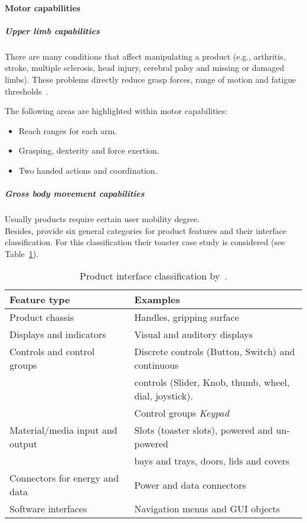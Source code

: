 \paragraph*{Motor capabilities}
\subparagraph*{Upper limb capabilities}
There are many conditions that affect manipulating a product (e.g., arthritis, 
stroke, multiple sclerosis, head injury, cerebral palsy and missing or damaged 
limbs). These problems directly reduce grasp forces, range of motion and fatigue 
thresholds~\cite{persad_characterising_2007}.

The following areas are highlighted within motor capabilities:
\begin{itemize}
  \item Reach ranges for each arm.
  \item Grasping, dexterity and force exertion.
  \item Two handed actions and coordination.
\end{itemize}

\subparagraph*{Gross body movement capabilities}
Usually products require certain user mobility degree. 
\\
Besides, \citeauthor{persad_characterising_2007} provide six general categories 
for product features and their interface classification. For this classification 
their toaster case study is considered (see Table~\ref{tbl:persad_product_interface}).

\begin{table}
  \caption{Product interface classification by~\citet{persad_characterising_2007}.}
  \label{tbl:persad_product_interface}
\footnotesize
\centering
    \begin{tabular}{l l}
    \hline
    \textbf{Feature type} & \textbf{Examples} \\
    \hline
    Product chassis & Handles, gripping surface \\
    Displays and indicators & Visual and auditory displays \\
    Controls and control groups & Discrete controls (Button, Switch) and continuous\\
    & controls (Slider, Knob, thumb, wheel, dial, joystick). \\
    & Control groups \textit{Keypad} \\
    Material/media input and output & Slots (toaster slots), powered and un-powered\\
    & bays and trays, doors, lids and covers\\
    Connectors for energy and data & Power and data connectors \\
    Software interfaces & Navigation menus and GUI objects \\
    \hline
  \end{tabular}
\end{table}